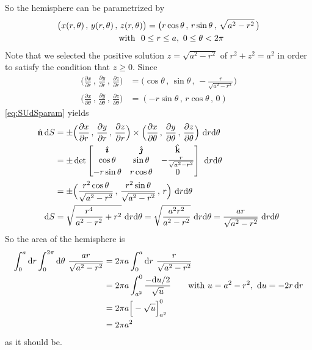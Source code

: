 \begin{eg}
So the hemisphere can be parametrized by
\begin{align*}
&\big(x(r,\theta)\,,\, y(r,\theta)\,,\, z(r,\theta)\big)
=\big(r\cos\theta\,,\,r\sin\theta\,,\,\sqrt{a^2-r^2}\,\big)\\
&\hskip1in\text{with }\ 
0\le r\le a,\ 0\le\theta<2\pi
\end{align*}
Note that we selected the positive solution $z=\sqrt{a^2-r^2}$ of $r^2+z^2=a^2$
in order to satisfy the condition that $z\ge 0$.
Since
\begin{align*}
\Big(\frac{\partial x}{\partial r}\,,\,\frac{\partial y}{\partial r}\,,\,
                     \frac{\partial z}{\partial r}\Big)
&=\Big(\cos\theta\,,\,\sin\theta\,,\,-\frac{r}{\sqrt{a^2-r^2}}\Big)\\
\Big(\frac{\partial x}{\partial\theta}\,,\,\frac{\partial y}{\partial\theta}
             \,,\, \frac{\partial z}{\partial\theta}\Big)
&=(-r\sin\theta\,,\,r\cos\theta\,,\,0) 
\end{align*}
\eqref{eq:SUdSparam} yields
\begin{align*}
\hat{\mathbf{n}}\,\mathrm{d}S
&=\pm\Big(\frac{\partial x}{\partial r}\,,\,\frac{\partial y}{\partial r}
   \,,\,\frac{\partial z}{\partial r}\Big)
\times
\Big(\frac{\partial x}{\partial\theta}\,,\,\frac{\partial y}{\partial\theta}
   \,,\, \frac{\partial z}{\partial\theta}\Big)
\ \mathrm{d}r\mathrm{d}\theta\\
&=\pm \det\left[\begin{matrix}
                \hat{\pmb{\imath}} & \hat{\pmb{\jmath}} & \hat{\mathbf{k}} \\
                \cos\theta & \sin\theta & -\frac{r}{\sqrt{a^2-r^2}} \\
                -r\sin\theta & r\cos\theta & 0
                \end{matrix}\right]\ \mathrm{d}r\mathrm{d}\theta
\\
&=\pm\Big(\frac{r^2\cos\theta}{\sqrt{a^2-r^2}}\,,\,
           \frac{r^2\sin\theta}{\sqrt{a^2-r^2}}\,,\,
          r\Big)\ \mathrm{d}r\mathrm{d}\theta \\
\mathrm{d}S&=\sqrt{ \frac{r^4}{a^2-r^2} +r^2}\ \mathrm{d}r\mathrm{d}\theta
        =\sqrt{ \frac{a^2r^2}{a^2-r^2}}\ \mathrm{d}r\mathrm{d}\theta
        =\frac{ar}{\sqrt{a^2-r^2}}\ \mathrm{d}r\mathrm{d}\theta
\end{align*}
So the area of the hemisphere is
\begin{align*}
\int_0^a \mathrm{d}r\int_0^{2\pi}\mathrm{d}\theta\ \frac{ar}{\sqrt{a^2-r^2}}
&=2\pi a\int_0^a \mathrm{d}r\ \frac{r}{\sqrt{a^2-r^2}}
\\
&=2\pi a\int_{a^2}^0 \frac{-\mathrm{d}u/2}{\sqrt{u}}
\qquad\text{with $u=a^2-r^2,\ \mathrm{d}u = -2r\,\mathrm{d}r$} \\
&=2\pi a\Big[-\sqrt{u}\Big]_{a^2}^0 \\
&=2\pi a^2
\end{align*}
as it should be.
\end{eg}


